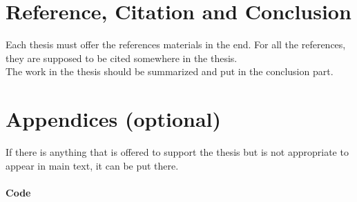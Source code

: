 \documentclass[12pt]{article}
\begin{document}
\section{Reference, Citation and Conclusion}
Each thesis must offer the references materials in the end. For all the references, they are supposed to be cited somewhere in the thesis.\\
The work in the thesis should be summarized and put in the conclusion part.\cite{APA:83}




\section*{Appendices (optional)}
If there is anything that is offered to support the thesis but is not appropriate to appear in main text, it can be put there.

\paragraph{Code}\mbox{}\\

\end{document}
